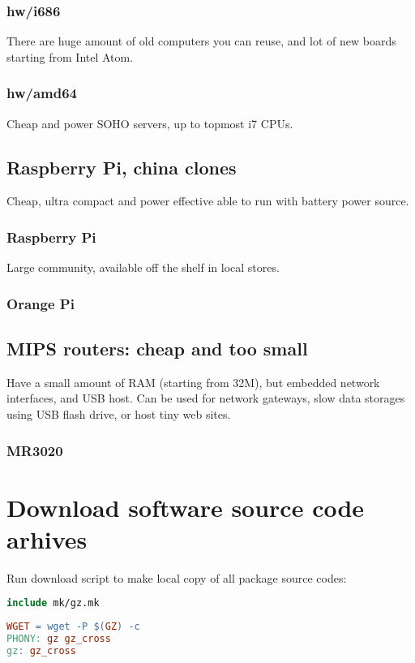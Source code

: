 \subsubsection{hw/i686}

There are huge amount of old computers you can reuse, and lot of new boards
starting from Intel Atom.

\subsubsection{hw/amd64}

Cheap and power SOHO servers, up to topmost i7 CPUs.

\subsection{Raspberry Pi, china clones}

Cheap, ultra compact and power effective able to run with battery power source.

\subsubsection{Raspberry Pi}

Large community, available off the shelf in local stores.

\subsubsection{Orange Pi} 

\subsection{MIPS routers: cheap and too small}

Have a small amount of RAM (starting from 32M), but embedded network
interfaces, and USB host. Can be used for network gateways, slow data
storages using USB flash drive, or host tiny web sites.

\subsubsection{MR3020}

\section{Download software source code arhives}

Run download script to make local copy of all package source codes:
\begin{lstlisting}[language=make,title=Makefile]
include mk/gz.mk
\end{lstlisting}
\begin{lstlisting}[language=make,title=mk/gz]
WGET = wget -P $(GZ) -c	
PHONY: gz gz_cross
gz: gz_cross
\end{lstlisting}

